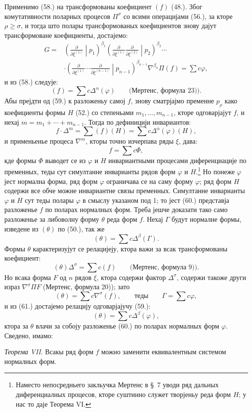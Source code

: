 \documentclass[11pt]{article}
\begin{document}
Применимо (58.) на трансформованы коефициент $(f)$ (48.). Због комутативности поларных процесов $\Pi^\sigma$ со всими операцијами (56.), за кторе $\rho\ge\sigma$, и тогда што полары трансформованых коефициентов знову дајут трансформоване коефициенты, достајемо:
\[
\begin{aligned}
G={}&\left(\frac{\partial}{\partial\xi^{(1)}}\middle|p_1\right)^{\beta_1}
\left(\frac{\partial}{\partial\xi^{(1)}}\frac{\partial}{\partial\xi^{(2)}}\middle|p_2\right)^{\beta_2}\cdots\\
&\cdot
\left(\frac{\partial}{\partial\xi^{(1)}}\cdots\frac{\partial}{\partial\xi^{(n-1)}}\middle|p_{n-1}\right)^{\beta_{n-1}}
\nabla^{\beta_n}\Pi(f)=\sum c\varphi,
\end{aligned}
\]
и из (58.) следује:
\begin{equation}
 (f)=\sum c\Delta^\alpha(\varphi)\qquad\text{(Мертенс, формула 23)).}
\tag{59}
\end{equation}
Абы прејдти од (59.) к разложеньу самој $f$, знову сматрјајмо пременне $p_\rho$ како коефициенты формы $H$ (52.) со степеньами $m_1,\ldots,m_{n-1}$, кторе одговарјајут $f$, и нехај $m=m_1+\cdots+m_{n-1}$. Тогда по дефиницији инвариантов:
\[
 f\cdot\Delta^m=\sum(f)(H)=\sum c\Delta^\alpha(\varphi)(H),
\]
и применьенье процеса $\nabla^m$, кторы точно изчерпава ряды $\xi$, дава:
\begin{equation}
 f=\sum c\Phi,
\tag{60}
\end{equation}
кде формы $\Phi$ выводет се из $\varphi$ и $H$ инвариантными процесами диференциације по пременных, теды сут симултанне инварианты рядов форм $\varphi$ и $H$.\footnote{Наместо непосредньего закльучка Мертенс в \S\ 7 уводи ряд дальных диференциалных процесов, кторе суштинно служет творјеньу реда форм $H$; у нас то даје Теорема VI.} Но понеже $\varphi$ јест нормална форма, ряд форм $\varphi$ ограничава се на саму форму $\varphi$; ряд форм $H$ содержи все обче можне инвариантне связы пременных. Симултанне инварианты $\varphi$ и $H$ сут теды полары $\varphi$ в смыслу указаном под 1; то јест (60.) представја разложенье $f$ по поларах нормалных форм. Треба јешче доказати тако само разложенье за либоволну форму $\theta$ реда форм $f$. Нехај $\Gamma$ будут нормалне формы, изведене из $(\theta)$ по (50.), так же
\begin{equation}
 (\theta)=\sum c\Delta^\beta(\Gamma).
\tag{61}
\end{equation}
Формы $\theta$ карактеризујут се релацијеју, ктора важи за всак трансформованы коефициент:
\[
 (\theta)\Delta^\sigma=\sum c(f)\qquad\text{(Мертенс, формула 9)).}
\]
Но всака форма $F$ од $n$ рядов $\xi$, ктора содержи фактор $\Delta^\sigma$, содержи такоже други израз $\nabla^\sigma\Pi F$ (Мертенс, формула 20)); зато
\[
 (\theta)=\sum c\nabla^\sigma(f),\qquad\text{теды}\qquad \Gamma=\sum c\varphi,
\]
и из (61.) достајемо релацију одговарјајучу (59.):
\[
 (\theta)=\sum c\Delta^\beta(\varphi),
\]
ктора за $\theta$ влачи за собоју разложенье (60.) по поларах нормалных форм $\varphi$. Сведено, имамо:

\emph{Теорема VII.} Всакы ряд форм $f$ можно заменити еквивалентным системом нормалных форм.
\end{document}
